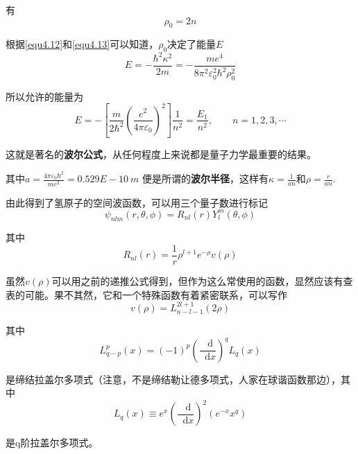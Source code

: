 \documentclass[UTF8]{ctexart}
\newcommand*{\dif}{\mathop{}\!\mathrm{d}}
\begin{document}
\noindent 有
\begin{equation}
    \rho_0 = 2n
\end{equation}

\noindent 根据\autoref{equ4.12}和\autoref{equ4.13}可以知道，$\rho_0$决定了能量$E$
\begin{equation}
    E = - \frac{\hbar^2 \kappa^2}{2m} = - \frac{m e^4}{8 \pi^2 \varepsilon_0^2 \hbar^2 \rho_0^2}
\end{equation}

\noindent 所以允许的能量为
\begin{equation}
    E = - \left[\frac{m}{2 \hbar^2} \left(\frac{e^2}{4 \pi \varepsilon_0}\right)^2\right] \frac{1}{n^2} = \frac{E_1}{n^2}, \qquad n=1,2,3,\cdots
\end{equation}

\noindent 这就是著名的\textbf{波尔公式}，从任何程度上来说都是量子力学最重要的结果。

\noindent 其中$a = \frac{4 \pi \varepsilon_0 \hbar^2}{m e^2} = 0.529E-10\ m$ 便是所谓的\textbf{波尔半径}，这样有$\kappa = \frac{1}{an}$和$\rho = \frac{r}{an}$. 

    由此得到了氢原子的空间波函数，可以用三个量子数进行标记
    \begin{equation}
        \psi_{nlm}(r,\theta,\phi) = R_{nl}(r) Y_l^m(\theta,\phi)
    \end{equation}

\noindent 其中 
\begin{equation}
    R_{nl}(r) = \frac{1}{r} \rho^{l+1} e^{-\rho} v(\rho)
\end{equation}

    虽然$v(\rho)$可以用之前的递推公式得到，但作为这么常使用的函数，显然应该有查表的可能。果不其然，它和一个特殊函数有着紧密联系，可以写作
    \begin{equation}
        v(\rho) = L_{n-l-1}^{2l+1} (2 \rho)
    \end{equation}

\noindent 其中 
\begin{equation}
    L_{q-p}^p(x) = (-1)^{p}\left(\frac{\dif}{\dif x}\right)^q L_q(x)
\end{equation}

\noindent 是缔结拉盖尔多项式（注意，不是缔结勒让德多项式，人家在球谐函数那边），其中
\begin{equation}
    L_q(x) \equiv e^x \left(\frac{\dif}{\dif x}\right)^2 (e^{-x}x^q)
\end{equation}

\noindent 是q阶拉盖尔多项式。
\end{document}
